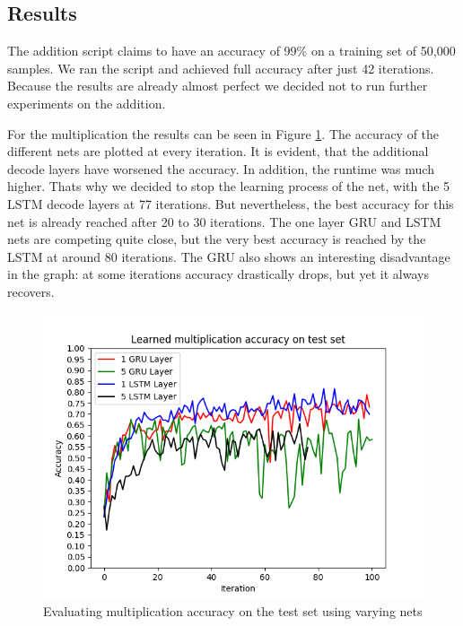 \documentclass{article}[]
\begin{document}
\subsection{Results}
The addition script claims to have an accuracy of 99\% on a training set of 50,000 samples.
We ran the script and achieved full accuracy after just 42 iterations.
Because the results are already almost perfect we decided not to run further experiments on the addition.


For the multiplication the results can be seen in Figure \ref{fig:multiply}.
The accuracy of the different nets are plotted at every iteration.
It is evident, that the additional decode layers have worsened the accuracy.
In addition, the runtime was much higher.
Thats why we decided to stop the learning process of the net, with the 5 LSTM decode layers at 77 iterations.
But nevertheless, the best accuracy for this net is already reached after 20 to 30 iterations.
The one layer GRU and LSTM nets are competing quite close, but the very best accuracy is reached by the LSTM at around 80 iterations.
The GRU also shows an interesting disadvantage in the graph: at some iterations accuracy drastically drops, but yet it always recovers.

\begin{figure}[H]
\centering
\includegraphics[width=1\linewidth]{img/multiply}
\caption{Evaluating multiplication accuracy on the test set using varying nets}
\label{fig:multiply}
\end{figure}
\end{document}
